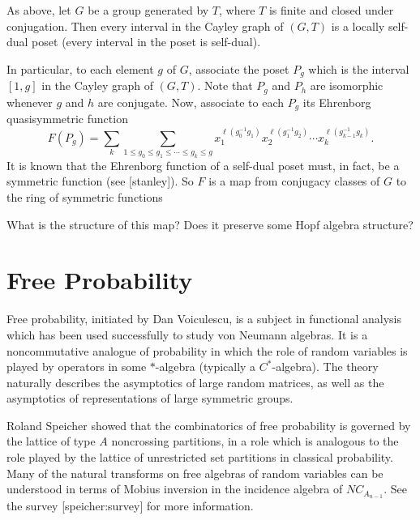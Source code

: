 \documentclass[12pt,letterpaper, reqno]{amsart}
\begin{document}
\begin{problemblock}
As above, let $G$ be a group generated by $T$, where $T$ is finite and closed under conjugation. Then every interval in the Cayley graph of $(G,T)$ is a locally self-dual poset (every interval in the poset is self-dual).

In particular, to each element $g$ of $G$, associate the poset $P_g$ which is the interval $[1,g]$ in the Cayley graph of $(G,T)$. Note that $P_g$ and $P_h$ are isomorphic whenever $g$ and $h$ are conjugate. Now, associate to each $P_g$ its Ehrenborg quasisymmetric function
$$
F(P_g)= \sum_k
\sum_{1\leq g_0\leq g_1\leq\cdots\leq g_k\leq g}
x_1^{\ell(g_0^{-1}g_1)} x_2^{\ell(g_1^{-1}g_2)}\cdots x_k^{\ell(g_{k-1}^{-1}g_k)}.
$$
It is known that the Ehrenborg function of a self-dual poset must, in fact, be a symmetric function (see [stanley]). So $F$ is a map from conjugacy classes of $G$ to the ring of symmetric functions


\begin{problem}[4.4]
What is the structure of this map? Does it preserve some Hopf algebra structure?
\end{problem}

\end{problemblock}

\section{Free Probability}
Free probability, initiated by Dan Voiculescu, is a subject in functional analysis which has been used successfully to study von Neumann algebras. It is a noncommutative analogue of probability in which the role of random variables is played by operators in some $*$-algebra (typically a $C^*$-algebra). The theory naturally describes the asymptotics of large random matrices, as well as the asymptotics of representations of large symmetric groups.

Roland Speicher showed that the combinatorics of free probability is governed by the lattice of type $A$ noncrossing partitions, in a role which is analogous to the role played by the lattice of unrestricted set partitions in classical probability. Many of the natural transforms on free algebras of random variables can be understood in terms of Mobius inversion in the incidence algebra of $NC_{A_{n-1}}$. See the survey [speicher:survey] for more information.
\end{document}
